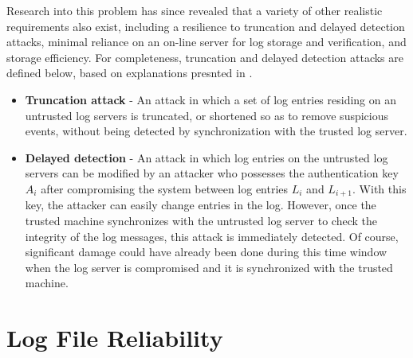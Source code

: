 \documentclass{sig-alternate}
\begin{document}
Research into this problem has since revealed that a variety of other realistic
requirements also exist, including a resilience to truncation and delayed detection attacks, 
minimal reliance on an on-line server for log storage and verification, and storage efficiency. 
For completeness, truncation and delayed detection attacks are defined below, based on 
explanations presnted in \cite{ma2008practical}.

\begin{itemize}
  \item \textbf{Truncation attack} - An attack in which a set of log entries residing on an untrusted log
servers is truncated, or shortened so as to remove suspicious events, without being detected by 
synchronization with the trusted log server.
  \item \textbf{Delayed detection} - An attack in which log entries on the untrusted log servers can be 
  modified by an attacker who possesses the authentication key $A_i$ after compromising the system between
  log entries $L_i$ and $L_{i+1}$. With this key, the attacker can easily change entries in the log. However, once the trusted machine synchronizes with the untrusted log server to check the integrity of the log messages, this attack is immediately detected. Of course, significant damage could have already been done during this time window when the log server is compromised and it is synchronized with the trusted machine.
\end{itemize}


\section{Log File Reliability}
\label{sec:LogConstruction}

\end{document}
